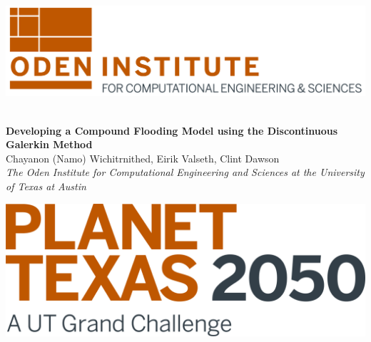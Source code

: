 \documentclass[american]{article}
\title{}
\author{}
\date{}
\begin{document}

\begin{center}
  \begin{minipage}{.2\linewidth}
    \includegraphics[width=\linewidth]{media/images/oden-logo-2019.png}
    ~\vfill
    ~\vfill
  \end{minipage}
  \begin{minipage}{.6\linewidth}
    \begin{center}
       \textsf{\textbf{{\fontsize{65}{108}\selectfont  Developing a Compound Flooding Model using the Discontinuous Galerkin Method}}}\\\vspace{1cm}
       \textrm{\fontsize{40}{48}\selectfont Chayanon (Namo) Wichitrnithed, Eirik Valseth, Clint Dawson \\\vspace{5mm} \textit{The Oden Institute for Computational Engineering and Sciences at the University of Texas at Austin} \vspace{5mm} }
    \end{center}
  \end{minipage}
  \hspace{.03\linewidth}
    \begin{minipage}{.16\linewidth}
    \includegraphics[width=\linewidth]{media/planet.png}
    ~\vfill
    ~\vfill
  \end{minipage}
\end{center}
\end{document}
